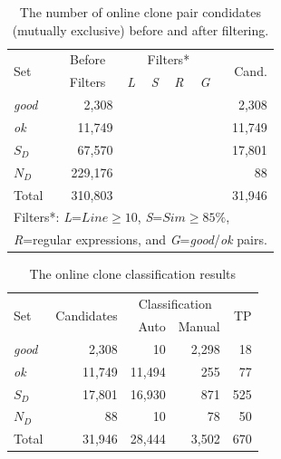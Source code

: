 \documentclass{sig-alternate-05-2015}
\begin{document}
\begin{table}
	\centering
	\caption{The number of online clone pair condidates (mutually exclusive) before and after filtering.}
	\label{tab:online_clone_pairs}
	\small
	\begin{tabular}{l|r|c|c|c|c|r}
		\hline
		\multirow{2}{*}{Set} & \multicolumn{1}{c|}{Before} & \multicolumn{4}{c|}{Filters*} & \multirow{2}{*}{Cand.} \\ \cline{3-6}
		& \multicolumn{1}{c|}{Filters} & \textit{L} & \textit{S} & \textit{R} & \textit{G} & \\
		\hline 
		\multirow{1}{*}{\textit{good}} & 2,308 & & & & & 2,308 \\
		\multirow{1}{*}{\textit{ok}} & 11,749 & & & & & 11,749 \\
		\multirow{1}{*}{$S_D$} & 67,570 & \checkmark & & \checkmark & \checkmark & 17,801 \\
		\multirow{1}{*}{$N_D$} & 229,176 & & \checkmark & \checkmark & \checkmark & 88 \\ 
		\hline
		Total  & 310,803 & & & & & 31,946 \\ 
		\hline
		\multicolumn{7}{l}{\scriptsize{Filters*: \textit{L}=$Line \geq 10$, \textit{S}=$Sim \geq 85\%$,}} \\
		\multicolumn{7}{l}{\scriptsize{\textit{R}=regular expressions, and \textit{G}=\textit{good}/\textit{ok} pairs.}} \\
	\end{tabular} %
\end{table}

\begin{table}
	\centering
	\caption{The online clone classification results}
	\label{tab:online_clone_classification_results}
	\small
	\begin{tabular}{l|r|r|r|r}
		\hline
		\multirow{2}{*}{Set} & \multirow{2}{*}{Candidates} & \multicolumn{2}{c|}{Classification} & \multirow{2}{*}{TP} \\ \cline{3-4}
		& & Auto & Manual & \\
		\hline 
		\multirow{1}{*}{\textit{good}} & 2,308 & 10 & 2,298 & 18 \\
		\multirow{1}{*}{\textit{ok}} & 11,749 & 11,494 & 255 & 77 \\
		\multirow{1}{*}{$S_D$} & 17,801 & 16,930 & 871 & 525 \\
		\multirow{1}{*}{$N_D$} & 88 & 10 & 78 & 50 \\ 
		\hline
		Total  & 31,946 & 28,444 & 3,502 & 670 \\ 
		\hline
	\end{tabular} %
\end{table}
\end{document}
